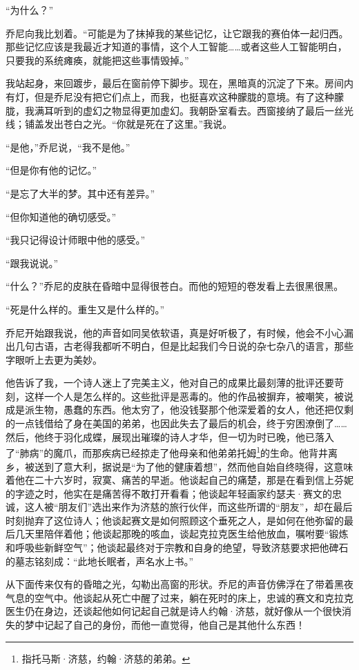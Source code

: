 \documentclass[AutoFakeBold=true]{book}
\begin{document}
``为什么？''

乔尼向我比划着。``可能是为了抹掉我的某些记忆，让它跟我的赛伯体一起归西。那些记忆应该是我最近才知道的事情，这个人工智能……或者这些人工智能明白，只要我的系统瘫痪，就能把这些事情毁掉。''

我站起身，来回踱步，最后在窗前停下脚步。现在，黑暗真的沉淀了下来。房间内有灯，但是乔尼没有把它们点上，而我，也挺喜欢这种朦胧的意境。有了这种朦胧，我满耳听到的虚幻之物显得更加虚幻。我朝卧室看去。西窗接纳了最后一丝光线；铺盖发出苍白之光。``你就是死在了这里。''我说。

``是他，''乔尼说，``我不是他。''

``但是你有他的记忆。''

``是忘了大半的梦。其中还有差异。''

``但你知道他的确切感受。''

``我只记得设计师眼中他的感受。''

``跟我说说。''

``什么？''乔尼的皮肤在昏暗中显得很苍白。而他的短短的卷发看上去很黑很黑。

``死是什么样的。重生又是什么样的。''

乔尼开始跟我说，他的声音如同吴依软语，真是好听极了，有时候，他会不小心漏出几句古语，古老得我都听不明白，但是比起我们今日说的杂七杂八的语言，那些字眼听上去更为美妙。

他告诉了我，一个诗人迷上了完美主义，他对自己的成果比最刻薄的批评还要苛刻，这样一个人是怎么样的。这些批评是恶毒的。他的作品被摒弃，被嘲笑，被说成是派生物，愚蠢的东西。他太穷了，他没钱娶那个他深爱着的女人，他还把仅剩的一点钱借给了身在美国的弟弟，也因此失去了最后的机会，终于穷困潦倒了……然后，他终于羽化成蝶，展现出璀璨的诗人才华，但一切为时已晚，他已落入了``肺病''的魔爪，而那疾病已经掠走了他母亲和他弟弟托姆\footnote{指托马斯·济慈，约翰·济慈的弟弟。}的生命。他背井离乡，被送到了意大利，据说是``为了他的健康着想''，然而他自始自终晓得，这意味着他在二十六岁时，寂寞、痛苦的早逝。他谈起自己的痛楚，那是在看到信上芬妮的字迹之时，他实在是痛苦得不敢打开看看；他谈起年轻画家约瑟夫·赛文的忠诚，这人被``朋友们''选出来作为济慈的旅行伙伴，而这些所谓的``朋友''，却在最后时刻抛弃了这位诗人；他谈起赛文是如何照顾这个垂死之人，是如何在他弥留的最后几天里陪伴着他；他谈起那晚的咳血，谈起克拉克医生给他放血，嘱咐要``锻炼和呼吸些新鲜空气''；他谈起最终对于宗教和自身的绝望，导致济慈要求把他碑石的墓志铭刻成：``此地长眠者，声名水上书。''

从下面传来仅有的昏暗之光，勾勒出高窗的形状。乔尼的声音仿佛浮在了带着黑夜气息的空气中。他谈起从死亡中醒了过来，躺在死时的床上，忠诚的赛文和克拉克医生仍在身边，还谈起他如何记起自己就是诗人约翰·济慈，就好像从一个很快消失的梦中记起了自己的身份，而他一直觉得，他自己是其他什么东西！
\end{document}
